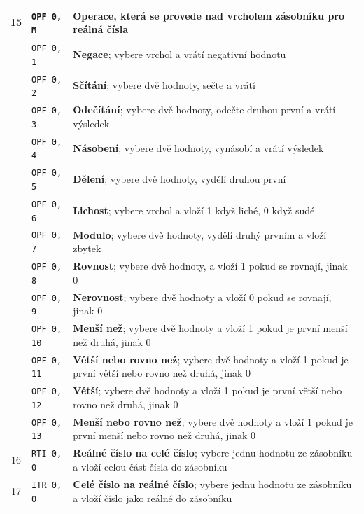 \documentclass[
12pt,
a4paper,
pdftex,
czech,
titlepage
]{report}
\begin{document}
\begin{longtable}{|c|l|p{10cm}|}
\rule{0pt}{3ex}15 & \texttt{OPF 0, M} & \textbf{Operace}, která se provede nad vrcholem zásobníku \textbf{pro reálná čísla} \\ \hline
\rule{0pt}{3ex} & \texttt{OPF 0, 1} & \textbf{Negace}; vybere vrchol a vrátí negativní hodnotu \\ \hline
\rule{0pt}{3ex} & \texttt{OPF 0, 2} & \textbf{Sčítání}; vybere dvě hodnoty, sečte a vrátí \\ \hline
\rule{0pt}{3ex} & \texttt{OPF 0, 3} & \textbf{Odečítání}; vybere dvě hodnoty, odečte druhou první a vrátí výsledek \\ \hline
\rule{0pt}{3ex} & \texttt{OPF 0, 4} & \textbf{Násobení}; vybere dvě hodnoty, vynásobí a vrátí výsledek \\ \hline
\rule{0pt}{3ex} & \texttt{OPF 0, 5} & \textbf{Dělení}; vybere dvě hodnoty, vydělí druhou první \\ \hline
\rule{0pt}{3ex} & \texttt{OPF 0, 6} & \textbf{Lichost}; vybere vrchol a vloží 1 když liché, 0 když sudé \\ \hline
\rule{0pt}{3ex} & \texttt{OPF 0, 7} & \textbf{Modulo}; vybere dvě hodnoty, vydělí druhý prvním a vloží zbytek \\ \hline
\rule{0pt}{3ex} & \texttt{OPF 0, 8} & \textbf{Rovnost}; vybere dvě hodnoty, a vloží 1 pokud se rovnají, jinak 0 \\ \hline
\rule{0pt}{3ex} & \texttt{OPF 0, 9} & \textbf{Nerovnost}; vybere dvě hodnoty a vloží 0 pokud se rovnají, jinak 0 \\ \hline
\rule{0pt}{3ex} & \texttt{OPF 0, 10} & \textbf{Menší než}; vybere dvě hodnoty a vloží 1 pokud je první menší než druhá, jinak 0 \\ \hline
\rule{0pt}{3ex} & \texttt{OPF 0, 11} & \textbf{Větší nebo rovno než}; vybere dvě hodnoty a vloží 1 pokud je první větší nebo rovno než druhá, jinak 0 \\ \hline
\rule{0pt}{3ex} & \texttt{OPF 0, 12} & \textbf{Větší}; vybere dvě hodnoty a vloží 1 pokud je první větší nebo rovno než druhá, jinak 0 \\ \hline
\rule{0pt}{3ex} & \texttt{OPF 0, 13} & \textbf{Menší nebo rovno než}; vybere dvě hodnoty a vloží 1 pokud je první menší nebo rovno než druhá, jinak 0 \\ \hline
\rule{0pt}{3ex} 16 & \texttt{RTI 0, 0} & \textbf{Reálné číslo na celé číslo}; vybere jednu hodnotu ze zásobníku a vloží celou část čísla do zásobníku \\ \hline
\rule{0pt}{3ex} 17 & \texttt{ITR 0, 0} & \textbf{Celé číslo na reálné číslo}; vybere jednu hodnotu ze zásobníku a vloží číslo jako reálné do zásobníku \\ \hline

\end{longtable}
\end{document}
